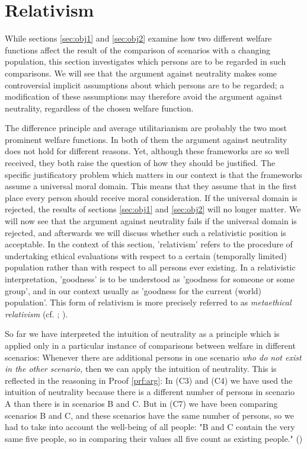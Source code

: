 \section{Relativism}
\label{sec:obj3}

While sections \ref{sec:obj1} and \ref{sec:obj2} examine how two different welfare functions affect the result of the comparison of scenarios with a changing population, this section investigates which persons are to be regarded in such comparisons. We will see that the argument against neutrality makes some controversial implicit assumptions about which persons are to be regarded; a modification of these assumptions may therefore avoid the argument against neutrality, regardless of the chosen welfare function. 

The difference principle and average utilitarianism are probably the two most prominent welfare functions. In both of them the argument against neutrality does not hold for different reasons. Yet, although these frameworks are so well received, they both raise the question of how they should be justified. The specific justificatory problem which matters in our context is that the frameworks assume a universal moral domain. This means that they assume that in the first place every person should receive moral consideration. If the universal domain is rejected, the results of sections \ref{sec:obj1} and \ref{sec:obj2} will no longer matter. We will now see that the argument against neutrality fails if the universal domain is rejected, and afterwards we will discuss whether such a relativistic position is acceptable. In the context of this section, 'relativism' refers to the procedure of undertaking ethical evaluations with respect to a certain (temporally limited) population rather than with respect to all persons ever existing. In a relativistic interpretation, 'goodness' is to be understood as 'goodness for someone or some group', and in our context usually as 'goodness for the current (world) population'. This form of relativism is more precisely referred to as \emph{metaethical relativism} (cf. ; ).

So far we have interpreted the intuition of neutrality as a principle which is applied only in a particular instance of comparisons between welfare in different scenarios: Whenever there are additional persons in one scenario \emph{who do not exist in the other scenario,} then we can apply the intuition of neutrality. This is reflected in the reasoning in Proof \ref{prf:arg}: In (C3) and (C4) we have used the intuition of neutrality because there is a different number of persons in scenario A than there is in scenarios B and C. But in (C7) we have been comparing scenarios B and C, and these scenarios have the same number of persons, so we had to take into account the well-being of all people: "B and C contain the very same five people, so in comparing their values all five count as existing people." ()

